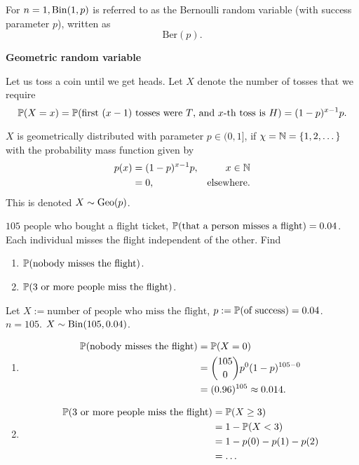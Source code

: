 \documentclass[10pt, a4paper]{article}
\begin{document}
For $n = 1,
\Bin(1, p)$ is referred to as the Bernoulli random variable
(with success parameter $p$),
written as
\[
\mathrm{Ber}(p).
\]

\textbf{Geometric random variable}

Let us toss a coin until we get heads.
Let $X$ denote the number of tosses that we require
\[
\P(X = x) = \P(\text{first $(x - 1)$ tosses were $T$, and $x$-th toss is $H$}) = (1 - p) ^ {x - 1}p.
\]

\begin{definition}
    $X$ is geometrically distributed with parameter $p \in (0, 1]$,
    if $\chi = \N = \{1, 2, \dotsc\}$ with the probability mass function given by
    \begin{align*}
        p(x) &= (1 - p) ^ {x - 1}p,&x \in \N \\
        &= 0,&\text{elsewhere}.
    \end{align*}
    This is denoted $X \sim \Geo(p)$.
\end{definition}

\begin{example}
    $105$ people who bought a flight ticket,
    $\P(\text{that a person misses a flight}) = 0.04$.
    Each individual misses the flight independent of the other.
    Find
    \begin{enumerate}[label = (\alph*)]
        \item $\P(\text{nobody misses the flight})$.
        \item $\P(\text{$3$ or more people miss the flight})$.
    \end{enumerate}

    Let $X := \text{number of people who miss the flight}$, $p := \P(\text{of success}) = 0.04$.
    $n = 105$.
    $X \sim \Bin(105, 0.04)$.
    \begin{enumerate}[label = (\alph*)]
        \item
        \begin{align*}
        \P(\text{nobody misses the flight}) &= \P(X = 0) \\
        &= \binom{105}{0}p ^ 0(1 - p) ^ {105 - 0} \\
        &= (0.96) ^ {105} \approx 0.014.
        \end{align*}
        \item
        \begin{align*}
            \P(\text{$3$ or more people miss the flight}) &= \P(X \geq 3) \\
            &= 1 - \P(X < 3) \\
            &= 1 - p(0) - p(1) - p(2) \\
            &= \dotsc
        \end{align*}
    \end{enumerate}
\end{example}
\end{document}
